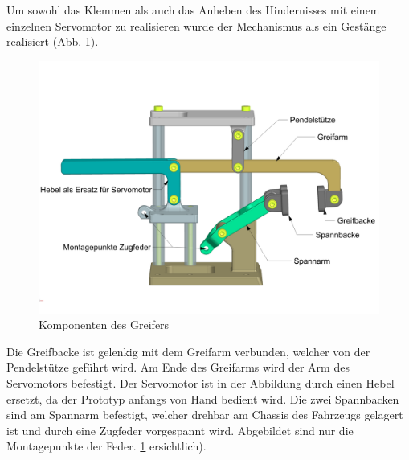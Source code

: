 \newpage

Um sowohl das Klemmen als auch das Anheben des Hindernisses mit einem einzelnen Servomotor zu realisieren wurde der Mechanismus als ein Gestänge realisiert (Abb. \ref{fig:gripper_components}).

\begin{figure}[H]
\centering
\includegraphics[width=1.0\linewidth]{assets/greifer-prototyp/Greifer_side_Komponentennamen.png} 
\caption{Komponenten des Greifers}
\label{fig:gripper_components}
\end{figure}

Die Greifbacke ist gelenkig mit dem Greifarm verbunden, welcher von der Pendelstütze geführt wird. Am Ende des Greifarms wird der Arm des Servomotors befestigt. Der Servomotor ist in der Abbildung durch einen Hebel ersetzt, da der Prototyp anfangs von Hand bedient wird. Die zwei Spannbacken sind am Spannarm befestigt, welcher drehbar am Chassis des Fahrzeugs gelagert ist und durch eine Zugfeder vorgespannt wird. Abgebildet sind nur die Montagepunkte der Feder. \ref{fig:gripper_components} ersichtlich). 

\newpage

